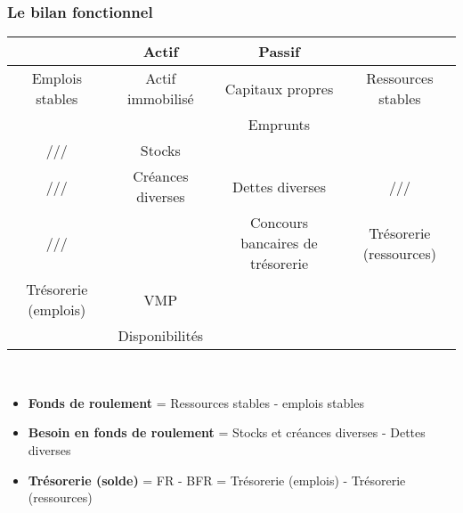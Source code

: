 \subsubsection{Le bilan fonctionnel}

\begin{tabular}{c|c|c|c}
	&	Actif	&	Passif	&	\\
	
	\hline
	
	Emplois stables & Actif immobilisé & Capitaux propres	& Ressources stables \\

	\cline{3-3}	
	
	& &	Emprunts & \\
	
	\cline{1-2}
	
	/// &	Stocks	&	& \\
	
	\cline{2-4}
	
	/// &	Créances diverses	&	Dettes diverses	& /// \\
	
	\cline{4-4}
	
	/// &	&	Concours bancaires de trésorerie	&	Trésorerie (ressources) \\
	
	\cline{1-3}
	Trésorerie (emplois) &	VMP	&	& \\
	
	&	Disponibilités	&	& \\
	
	\hline	
	
\end{tabular}\\

\begin{itemize}
	\item \textbf{Fonds de roulement} = Ressources stables - emplois stables
	\item \textbf{Besoin en fonds de roulement} = Stocks et créances diverses - Dettes diverses
	\item \textbf{Trésorerie (solde)} = FR - BFR = Trésorerie (emplois) - Trésorerie (ressources)
\end{itemize}